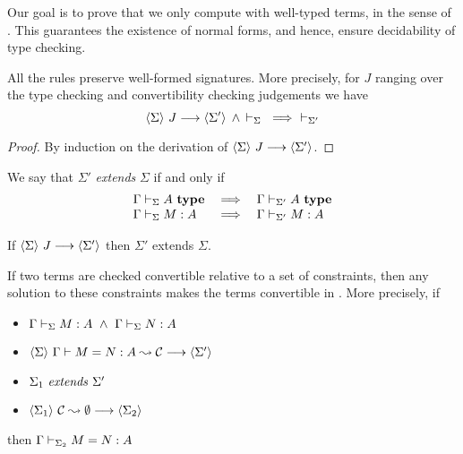 
Our goal is to prove that we only compute with well-typed terms, in the sense
of {\Core}. This guarantees the existence of normal forms, and hence, ensure
decidability of type checking.

\begin{lemma}
    All the rules preserve well-formed signatures. More precisely, for $J$
    ranging over the type checking and convertibility checking judgements we
    have
    \[{\langle {\Sigma} \rangle ~{J} \longrightarrow \langle {\Sigma'} \rangle} \, \mathrel{\wedge} \,
	{\vdash_{\Sigma}}  ~ \implies ~ \vdash_{\Sigma'}
    \]
\end{lemma}
\begin{proof}
    By induction on the derivation of $\langle {\Sigma} \rangle ~{J} \longrightarrow \langle {\Sigma'} \rangle$.
\end{proof}

\begin{definition}
    We say that $\Sigma'$ {\em extends} $\Sigma$ if and only if
    \[\begin{array}{lcl}
	\Gamma\vdash_{\Sigma}A ~ \mathbf{type} & \implies & \Gamma\vdash_{\Sigma'}A ~ \mathbf{type} \\
	\Gamma\vdash_{\Sigma}M:A & \implies & \Gamma\vdash_{\Sigma'}M:A
    \end{array}\]
\end{definition}

\begin{lemma} \label{lemExtendSig}
    If $\langle {\Sigma} \rangle ~{J} \longrightarrow \langle {\Sigma'} \rangle$ then $\Sigma'$ extends $\Sigma$.
\end{lemma}

\begin{lemma} \label{thmConvSound}
    If two terms are checked convertible relative to a set of constraints, then
    any solution to these constraints makes the terms convertible in {\Core}.
    More precisely, if
    \begin{itemize}
	\item \( \Gamma\vdash_{\Sigma}M:A ~ \wedge ~
		 \Gamma\vdash_{\Sigma}N:A
	      \)
	\item $\langle {\Sigma} \rangle ~{{\Gamma} \vdash {M} = {N} : {A} \leadsto {\mathcal{C}}} \longrightarrow \langle {\Sigma'} \rangle$
	\item $ {\Sigma_1} ~ \mathit{extends} ~ {\Sigma'}$
	\item $\langle {\Sigma_1} \rangle ~{{\mathcal{C}} \leadsto {\emptyset}} \longrightarrow \langle {\Sigma_2} \rangle
	      $
    \end{itemize}
    then \( \Gamma\vdash_{\Sigma_2}M=N:A \)
\end{lemma}

